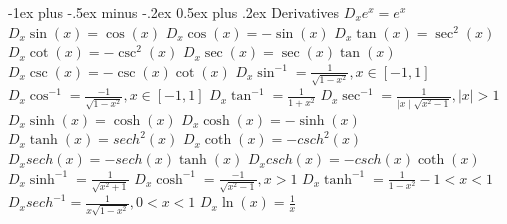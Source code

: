 \documentclass[10pt,landscape]{article}
\makeatletter
\renewcommand{\section}{\@startsection{section}{1}{0mm}%
                                {-1ex plus -.5ex minus -.2ex}%
                                {0.5ex plus .2ex}%
                                {\normalfont\large\bfseries}}
\makeatother
\begin{document}
\raggedright
\footnotesize
\begin{multicols*}{5}


\setlength{\premulticols}{1pt}
\setlength{\postmulticols}{1pt}
\setlength{\multicolsep}{1pt}
\setlength{\columnsep}{2pt}

\section{Derivatives}
\scriptsize
$D_x e^x=e^x$\newline
$D_x \sin(x)=\cos(x)$\newline
$D_x \cos(x)=-\sin(x)$\newline
$D_x \tan(x)=\sec^2(x)$\newline
$D_x \cot(x)=-\csc^2(x)$\newline
$D_x \sec(x)=\sec(x)\tan(x)$\newline
$D_x \csc(x)=-\csc(x)\cot(x)$\newline
$D_x \sin^{-1}=\frac{1}{\sqrt{1-x^2}}, x \in [-1,1]$\newline
$D_x \cos^{-1}=\frac{-1}{\sqrt{1-x^2}}, x \in [-1,1]$\newline
$D_x \tan^{-1}=\frac{1}{1+x^2}$\newline
$D_x \sec^{-1}=\frac{1}{\mid x \mid \sqrt{x^2-1}}, |x| > 1$\newline
$D_x \sinh(x)=\cosh(x)$\newline
$D_x \cosh(x)=-\sinh(x)$\newline
$D_x \tanh(x)=sech^2(x)$\newline
$D_x \coth(x)=-csch^2(x)$\newline
$D_x sech(x)=-sech(x)\tanh(x)$\newline
$D_x csch(x)=-csch(x)\coth(x)$\newline
$D_x \sinh^{-1}=\frac{1}{\sqrt{x^2+1}}$\newline
$D_x \cosh^{-1}=\frac{-1}{\sqrt{x^2-1}}, x > 1$\newline
$D_x \tanh^{-1}=\frac{1}{1-x^2} -1 < x < 1$\newline
$D_x sech^{-1}=\frac{1}{x \sqrt{1-x^2}}, 0 < x < 1$
$ D_x \ln(x) = \frac{1}{x} $


\end{multicols*}
\end{document}
